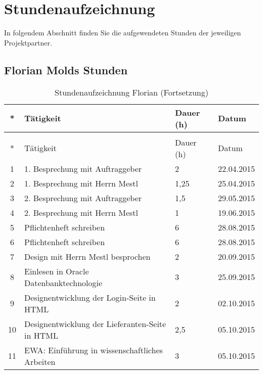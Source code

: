 \section{Stundenaufzeichnung}
In folgendem Abschnitt finden Sie die aufgewendeten Stunden der jeweiligen Projektpartner.
\subsection{Florian Molds Stunden}
\begin{longtable}[h]{| c | p{11.6cm} | l | l |}
\caption{Stundenaufzeichnung Florian}\label{tab:stundenaufzeichnung}\\ 
\toprule
* & Tätigkeit & Dauer (h) & Datum \\
\midrule
\endfirsthead
\caption[]{Stundenaufzeichnung Florian \small(Fortsetzung)}\\
\toprule
* & Tätigkeit & Dauer (h) & Datum \\
\midrule
\endhead
\midrule
\endfoot 
\bottomrule
\endlastfoot 
\hline

1 & 1. Besprechung mit Auftraggeber & 2 & 22.04.2015 \\ \hline

2 & 1. Besprechung mit Herrn Mestl & 1,25 & 25.04.2015 \\ \hline

3 & 2. Besprechung mit Auftraggeber & 1,5 & 29.05.2015 \\ \hline

4 & 2. Besprechung mit Herrn Mestl & 1 & 19.06.2015 \\ \hline

5 & Pflichtenheft schreiben & 6 & 28.08.2015 \\ \hline

6 & Pflichtenheft schreiben & 6 & 28.08.2015 \\ \hline

7 & Design mit Herrn Mestl besprochen & 2 & 20.09.2015 \\ \hline

8 & Einlesen in Oracle Datenbanktechnologie & 3 & 25.09.2015 \\ \hline

9 & Designentwicklung der Login-Seite in HTML & 2 & 02.10.2015 \\ \hline

10 & Designentwicklung der Lieferanten-Seite in HTML & 2,5 & 05.10.2015 \\ \hline

11 & EWA: Einführung in wissenschaftliches Arbeiten & 3 & 05.10.2015 \\ \hline


\end{longtable}
